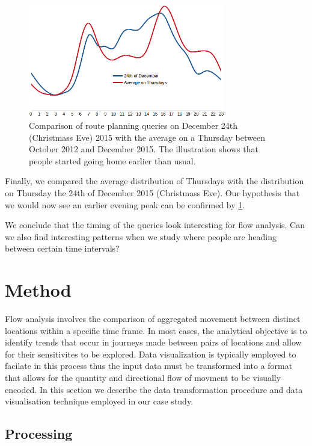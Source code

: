 \documentclass{sig-alternate}
\begin{document}
\begin{figure}
\centering
\includegraphics[width=8.6cm]{dec24}
\caption{Comparison of route planning queries on December 24th (Christmass Eve) 2015 with the average on a Thursday between October 2012 and December 2015. The illustration shows that people started going home earlier than usual.}
\label{fig:dec24}
\end{figure}

Finally, we compared the average distribution of Thursdays with the distribution on Thursday the 24th of December 2015 (Christmass Eve).
Our hypothesis that we would now see an earlier evening peak can be confirmed by \cref{fig:dec24}.

We conclude that the timing of the queries look interesting for flow analysis. 
Can we also find interesting patterns when we study where people are heading between certain time intervals?

\section{Method}
\label{sec:method}

Flow analysis involves the comparison of aggregated movement between distinct locations within a specific time frame. 
In most cases, the analytical objective is to identify trends that occur in journeys made  between pairs of locations and allow for their sensitivites to be explored. 
Data visualization is typically employed to facilate in this process thus the input data must be transformed into a format that allows for the quantity and directional flow of movment to be visually encoded. In this section we describe the data transformation procedure and data visualisation technique employed in our case study.

\subsection{Processing}
\end{document}
